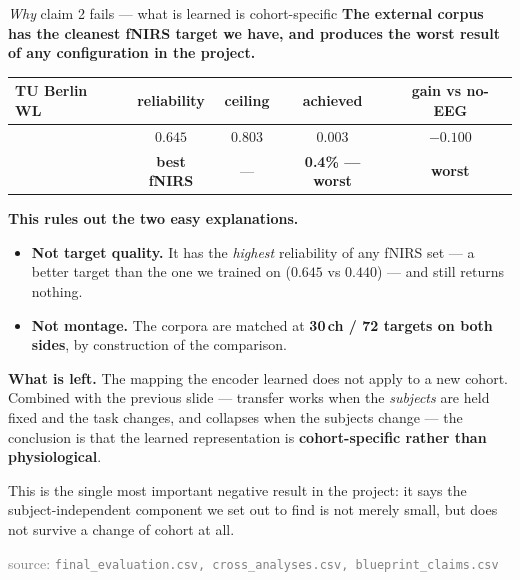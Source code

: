\documentclass[aspectratio=169,11pt]{beamer}
\newcommand{\src}[1]{{\scriptsize\textcolor{gray}{source: \texttt{#1}}}}
\begin{document}
\begin{frame}{\emph{Why} claim 2 fails --- what is learned is cohort-specific}
\textbf{The external corpus has the cleanest fNIRS target we have, and produces
the worst result of any configuration in the project.}

\begin{center}\small
\begin{tabular}{lcccc}
\toprule
TU Berlin WL & reliability & ceiling & achieved & gain vs no-EEG \\
\midrule
 & $0.645$ & $0.803$ & $0.003$ & $-0.100$ \\
 & \textbf{best fNIRS} & --- & \textbf{0.4\% --- worst} & \textbf{worst} \\
\bottomrule
\end{tabular}
\end{center}

\vspace{0.5em}
\textbf{This rules out the two easy explanations.}
\begin{itemize}
  \item \textbf{Not target quality.} It has the \emph{highest} reliability of any
        fNIRS set --- a better target than the one we trained on ($0.645$ vs
        $0.440$) --- and still returns nothing.
  \item \textbf{Not montage.} The corpora are matched at \textbf{30\,ch /
        72 targets on both sides}, by construction of the comparison.
\end{itemize}

\vspace{0.5em}
\textbf{What is left.} The mapping the encoder learned does not apply to a new
cohort. Combined with the previous slide --- transfer works when the
\emph{subjects} are held fixed and the task changes, and collapses when the
subjects change --- the conclusion is that the learned representation is
\textbf{cohort-specific rather than physiological}.

\vspace{0.4em}
\textcolor{warn}{This is the single most important negative result in the project:
it says the subject-independent component we set out to find is not merely small,
but does not survive a change of cohort at all.}

\vspace{0.2em}
\src{final\_evaluation.csv, cross\_analyses.csv, blueprint\_claims.csv}
\end{frame}

\end{document}

